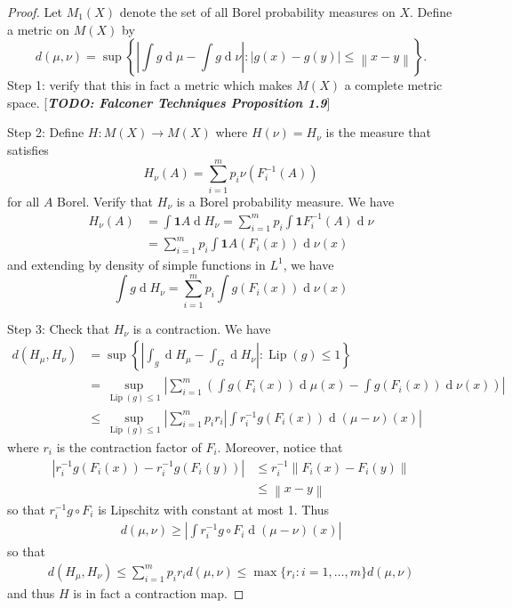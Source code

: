 \documentclass[11pt, a4paper]{memoir}
\newcommand{\norm}[1]{\ensuremath{\left\lVert#1\right\rVert}}
\theoremstyle{change}
\theoremstyle{plain}
\theoremstyle{nonumberplain}
\newtheorem{proof}{Proof}
\renewcommand{\d}[1]{\ensuremath{\operatorname{d}\!{#1}}}
\newcommand{\TODO}[1]{[\textit{\textbf{TODO: #1}}]}
\newcommand{\idc}{\mathbf{1}}
\DeclareMathOperator{\Lip}{Lip}
\numberwithin{equation}{section}
\begin{document}
\begin{proof}
    Let $M_1(X)$ denote the set of all Borel probability measures on $X$.
    Define a metric on $M(X)$ by
    \begin{equation*}
        d(\mu,\nu)=\sup\left\{\left|\int g\d{\mu}-\int g\d{\nu}\right|:|g(x)-g(y)|\leq\norm{x-y}\right\}.
    \end{equation*}
    Step 1: verify that this in fact a metric which makes $M(X)$ a complete metric space.
    \TODO{Falconer Techniques Proposition 1.9}

    Step 2: Define $H:M(X)\to M(X)$ where $H(\nu)=H_\nu$ is the measure that satisfies
    \begin{equation*}
        H_\nu(A)=\sum_{i=1}^m p_i\nu(F_i^{-1}(A))
    \end{equation*}
    for all $A$ Borel.
    Verify that $H_\nu$ is a Borel probability measure.
    We have
    \begin{align*}
        H_\nu(A) &= \int\idc{A}\d{H_\nu} = \sum_{i=1}^m p_i\int\idc{F_i^{-1}(A)}\d{\nu}\\
                 &= \sum_{i=1}^m p_i\int\idc{A}(F_i(x))\d{\nu(x)}
    \end{align*}
    and extending by density of simple functions in $L^1$, we have
    \begin{equation*}
        \int g\d{H_\nu}=\sum_{i=1}^m p_i\int g(F_i(x))\d{\nu(x)}
    \end{equation*}

    Step 3: Check that $H_\nu$ is a contraction.
    We have
    \begin{align*}
        d(H_\mu,H_\nu) &= \sup\left\{\left|\int_g\d{H_\mu}-\int_G\d{H_\nu}\right|:\Lip(g)\leq 1\right\}\\
                       &= \sup_{\Lip(g)\leq 1}\left|\sum_{i=1}^m\left(\int g(F_i(x))\d{\mu(x)}-\int g(F_i(x))\d{\nu(x)}\right)\right|\\
                       &\leq \sup_{\Lip(g)\leq 1}\left|\sum_{i=1}^m p_ir_i\left|\int r_i^{-1}g(F_i(x))\d{(\mu-\nu)(x)}\right|
    \end{align*}
    where $r_i$ is the contraction factor of $F_i$.
    Moreover, notice that
    \begin{align*}
        \left|r_i^{-1}g(F_i(x))-r_i^{-1}g(F_i(y))\right| &\leq r_i^{-1}\norm{F_i(x)-F_i(y)}\\
                                                         &\leq \norm{x-y}
    \end{align*}
    so that $r_i^{-1}g\circ F_i$ is Lipschitz with constant at most 1.
    Thus
    \begin{align*}
        d(\mu,\nu)\geq\left|\int r_i^{-1}g\circ F_i\d{(\mu-\nu)(x)}\right|
    \end{align*}
    so that
    \begin{align*}
        d(H_\mu,H_\nu)\leq \sum_{i=1}^m p_ir_i d(\mu,\nu)\leq\max\{r_i:i=1,\ldots,m\}d(\mu,\nu)
    \end{align*}
    and thus $H$ is in fact a contraction map.


\end{proof}
\end{document}
